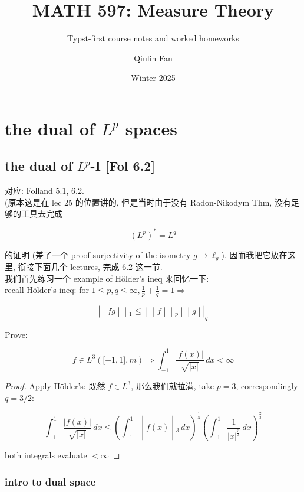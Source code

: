 \documentclass{qlnotes-export}
\title{MATH 597: Measure Theory}
\subtitle{Typst-first course notes and worked homeworks}
\author{Qiulin Fan}
\date{Winter 2025}
\begin{document}
\mainmatter
\chapter{\texorpdfstring{the dual of \(L^{p}\) spaces}{the dual of L\^{}\{p\} spaces}}\label{the-dual-of-lp-spaces}

\section{\texorpdfstring{the dual of \(L^{p}\)-I {[}Fol 6.2{]}}{the dual of L\^{}\{p\}-I {[}Fol 6.2{]}}}

对应: Folland 5.1, 6.2.\\
(原本这是在 lec 25 的位置讲的, 但是当时由于没有 Radon-Nikodym Thm, 没有足够的工具去完成

\[(L^{p})^{\ast} = L^{q}\]

的证明 (差了一个 proof surjectivity of the isometry \(g\rightarrow\ell_{g}\)). 因而我把它放在这里, 衔接下面几个 lectures, 完成 6.2 这一节.\\
我们首先练习一个 example of Hölder's ineq 来回忆一下:\\
recall Hölder's ineq: for \(1 \leq p,q \leq \infty,\frac{1}{p} + \frac{1}{q} = 1\Longrightarrow\)

\[\left. | \middle| fg \middle| \middle| {}_{1} \leq \middle| \middle| f \middle| \middle| {}_{p} \middle| \middle| g \middle| |_{q} \right.\]

\begin{example}

Prove:

\[f \in L^{3}(\lbrack - 1,1\rbrack,m)\Longrightarrow\int_{- 1}^{1}\frac{|f(x)|}{\sqrt{|x|}}\, dx < \infty\]

\end{example}

\begin{proof}

Apply Hölder's: 既然 \(f \in L^{3}\), 那么我们就拉满, take \(p = 3\), correspondingly \(q = 3/2\):

\[\left. \int_{- 1}^{1}\frac{|f(x)|}{\sqrt{|x|}}\, dx \leq (\int_{- 1}^{1} \middle| f(x) \middle| {}_{3}\, dx)^{\frac{1}{3}}(\int_{- 1}^{1}\frac{1}{|x|^{\frac{3}{4}}}\, dx)^{\frac{2}{3}} \right.\]

both integrals evaluate \(< \infty\)

\end{proof}

\subsection{intro to dual space}\label{intro-to-dual-space}
\end{document}
